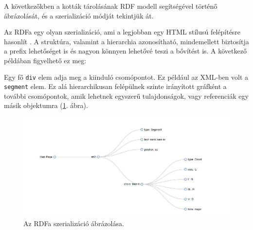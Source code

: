 
A következőkben a kották tárolásának RDF modell segítségével történő ábrázolását, és a szerializáció módját tekintjük át.


Az RDFa egy olyan szerializáció, ami a legjobban egy HTML stílusú felépítésre hasonlít \cite{rdfa_with_example}. A struktúra, valamint a hierarchia azonosítható, mindemellett biztosítja a prefix lehetőséget is és nagyon könnyen lehetővé teszi a bővítést is. A következő példában figyelhető ez meg:

Egy fő \texttt{div} elem adja meg a kiinduló csomópontot. Ez például az XML-ben volt a \texttt{segment} elem. Ez alá hierarchikusan felépülnek szinte irányított gráfként a további csomópontok, amik lehetnek egyszerű tulajdonságok, vagy referenciák egy másik objektumra (\ref{fig:rdfa}. ábra).

\begin{figure}[h]
	\centering
	\includegraphics[scale=0.8]{images/misc/RDFa_serialization_example.jpg}
	\caption{Az RDFa szerializáció ábrázolása.}
	\label{fig:rdfa}
\end{figure}



